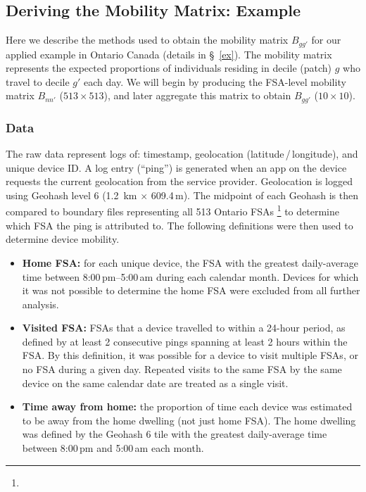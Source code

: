 \subsection{Deriving the Mobility Matrix: Example}\label{app.mob}
Here we describe the methods used to obtain the mobility matrix $B_{gg'}$
for our applied example in Ontario Canada (details in \S~\ref{ex}).
The mobility matrix  represents
the expected proportions of individuals residing in decile (patch) $g$ who travel to decile $g'$ each day.
We will begin by producing the FSA-level mobility matrix $B_{nn'}$ ($513 \times 513$),
and later aggregate this matrix to obtain $B_{gg'}$ ($10 \times 10$).
\subsubsection{Data}\label{app.mob.data}
The raw data represent logs of: timestamp, geolocation (latitude\,/\,longitude), and unique device ID.
A log entry (``ping'') is generated when an app on the device
requests the current geolocation from the service provider.
Geolocation is logged using Geohash level 6 (1.2 \,km $\times$ 609.4\,m).
The midpoint of each Geohash is then compared to boundary files representing all 513 Ontario FSAs%
\footnote{}
to determine which FSA the ping is attributed to.
The following definitions were then used to determine device mobility.
\begin{itemize}
  \item \textbf{Home FSA:} for each unique device,
  the FSA with the greatest daily-average time between 8:00\,pm--5:00\,am during each calendar month.
  Devices for which it was not possible to determine the home FSA were excluded from all further analysis.
  \item \textbf{Visited FSA:} FSAs that a device travelled to within a 24-hour period,
  as defined by at least 2 consecutive pings spanning at least 2 hours within the FSA.
  By this definition, it was possible for a device to visit multiple FSAs, or no FSA during a given day.
  Repeated visits to the same FSA by the same device on the same calendar date are treated as a single visit.
  \item \textbf{Time away from home:} the proportion of time each device
  was estimated to be away from the home dwelling (not just home FSA).
  The home dwelling was defined by the Geohash 6 tile
  with the greatest daily-average time between 8:00\,pm and 5:00\,am each month.
\end{itemize}
